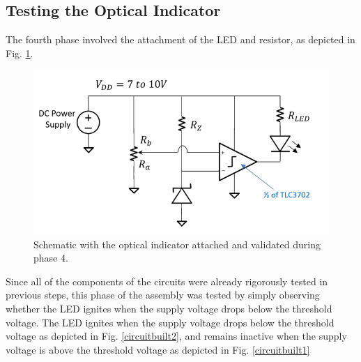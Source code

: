 \documentclass[conference]{IEEEtran}
\begin{document}
\subsection{Testing the Optical Indicator}

The fourth phase involved the attachment of the LED and resistor, as depicted in Fig. \ref{circuit4}.
\begin{figure}[htbp]
\centerline{\includegraphics{./images/circuit4.png}}
\caption{Schematic with the optical indicator attached and validated during phase 4. \cite{week7}}
\label{circuit4}
\end{figure}

Since all of the components of the circuits were already rigorously tested in previous steps, this phase of the assembly was tested by simply observing whether the LED ignites when the supply voltage drops below the threshold voltage. The LED ignites when the supply voltage drops below the threshold voltage as depicted in Fig. \ref{circuitbuilt2}, and remains inactive when the supply voltage is above the threshold voltage as depicted in Fig. \ref{circuitbuilt1}
\end{document}
